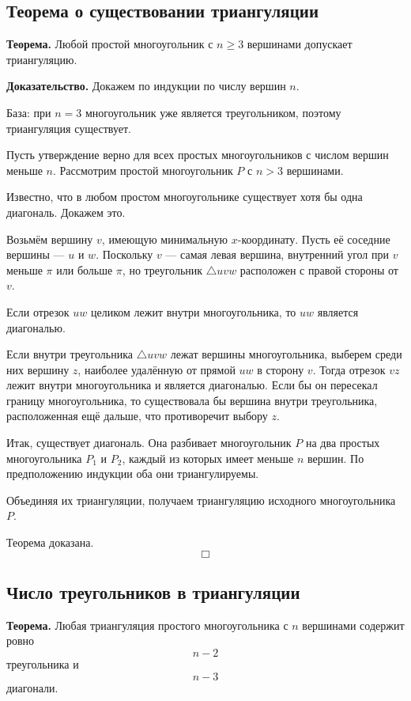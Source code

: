 \documentclass[12pt,a4paper]{article}
\begin{document}
\subsection{Теорема о существовании триангуляции}

\textbf{Теорема.}
Любой простой многоугольник с \(n\ge 3\) вершинами допускает триангуляцию.

\textbf{Доказательство.}
Докажем по индукции по числу вершин \(n\).

База: при \(n=3\) многоугольник уже является треугольником, поэтому триангуляция существует.

Пусть утверждение верно для всех простых многоугольников с числом вершин меньше \(n\). Рассмотрим простой многоугольник \(P\) с \(n>3\) вершинами.

Известно, что в любом простом многоугольнике существует хотя бы одна диагональ. Докажем это.

Возьмём вершину \(v\), имеющую минимальную \(x\)-координату. Пусть её соседние вершины — \(u\) и \(w\). Поскольку \(v\) — самая левая вершина, внутренний угол при \(v\) меньше \(\pi\) или больше \(\pi\), но треугольник \(\triangle uvw\) расположен с правой стороны от \(v\).

Если отрезок \(uw\) целиком лежит внутри многоугольника, то \(uw\) является диагональю.

Если внутри треугольника \(\triangle uvw\) лежат вершины многоугольника, выберем среди них вершину \(z\), наиболее удалённую от прямой \(uw\) в сторону \(v\). Тогда отрезок \(vz\) лежит внутри многоугольника и является диагональю. Если бы он пересекал границу многоугольника, то существовала бы вершина внутри треугольника, расположенная ещё дальше, что противоречит выбору \(z\).

Итак, существует диагональ. Она разбивает многоугольник \(P\) на два простых многоугольника \(P_1\) и \(P_2\), каждый из которых имеет меньше \(n\) вершин. По предположению индукции оба они триангулируемы.

Объединяя их триангуляции, получаем триангуляцию исходного многоугольника \(P\).

Теорема доказана.
\[
\Box
\]

\subsection{Число треугольников в триангуляции}

\textbf{Теорема.}
Любая триангуляция простого многоугольника с \(n\) вершинами содержит ровно
\[
n-2
\]
треугольника и
\[
n-3
\]
диагонали.
\end{document}
